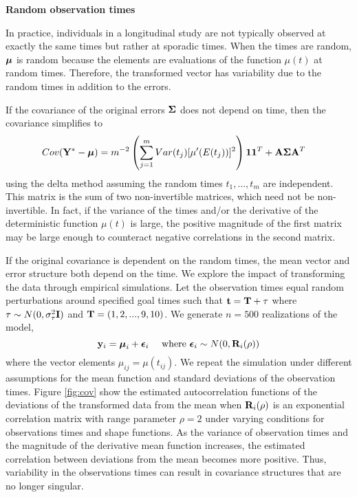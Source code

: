 \noindent \textbf{Random observation times}

In practice, individuals in a longitudinal study are not typically observed at exactly the same times but rather at sporadic times. When the times are random, $\boldsymbol\mu$ is random because the elements are evaluations of the function $\mu(t)$ at random times. Therefore, the transformed vector has variability due to the random times in addition to the errors. 

If the covariance of the original errors $\boldsymbol \Sigma$ does not depend on time, then the covariance simplifies to
\begin{align*}
Cov(\mathbf Y^{*} - \boldsymbol\mu)&=m^{-2}\left(\sum^{m}_{j=1}Var(t_{j})[\mu'(E(t_{j}))]^{2}\right) \mathbf 1\mathbf 1^{T}  + \mathbf A\boldsymbol\Sigma\mathbf A^{T}
\end{align*}
using the delta method assuming the random times $t_{1},...,t_{m}$ are independent. This matrix is the sum of two non-invertible matrices, which need not be non-invertible. In fact, if the variance of the times and/or the derivative of the deterministic function $\mu(t)$ is large, the positive magnitude of the first matrix may be large enough to counteract negative correlations in the second matrix. 

If the original covariance is dependent on the random times, the mean vector and error structure both depend on the time. We explore the impact of transforming the data through empirical simulations. Let the observation times equal random perturbations around specified goal times such that $\mathbf t = \mathbf T + \mathbf \tau$ where $\mathbf \tau\sim N(0,\sigma^{2}_{\tau}\mathbf I)$ and $\mathbf T = (1,2,...,9,10)$. We generate $n=500$ realizations of the model,
$$\mathbf y_{i} = \boldsymbol\mu_{i} + \boldsymbol\epsilon_{i}\quad\text{ where }\boldsymbol\epsilon_{i}\sim N(0,\mathbf R_{i}(\rho))$$
where the vector elements $\mu_{ij}=\mu(t_{ij})$. We repeat the simulation under different assumptions for the mean function and standard deviations of the observation times. Figure \ref{fig:cov} show the estimated autocorrelation functions of the deviations of the transformed data from the mean when  $\mathbf R_{i}(\rho)$ is an exponential correlation matrix with range parameter $\rho=2$ under varying conditions for observations times and shape functions. As the variance of observation times and the magnitude of the derivative mean function increases, the estimated correlation between deviations from the mean becomes more positive. Thus, variability in the observations times can result in covariance structures that are no longer singular. 

